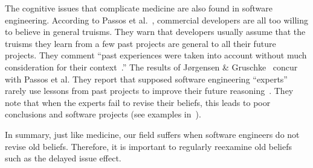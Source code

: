 \documentclass{sig-alternate}
\newcommand{\todo}[1]{\textcolor{Maroon}{TODO: #1}}
\begin{document}
The cognitive issues that complicate medicine are also found in software engineering.
According to Passos et al.~\cite{passos11}, commercial developers
are all too willing to believe in general
truisms.
They  warn that developers
usually assume that the truisms they learn from a few past
projects are general to 
all their future projects. They comment ``past experiences were taken into account without 
much consideration for their context~\cite{passos11}.''  
The results of J{\o}rgensen \& Gruschke~\cite{jorgensen09} concur with Passos et al. They report that 
  supposed software engineering    ``experts'' rarely use lessons
  from past projects to improve their future reasoning~\cite{jorgensen09}. 
 They note that
when the experts
  fail to revise their beliefs, this leads to poor
 conclusions and software projects  (see examples in~\cite{jorgensen09}).

In summary, just like medicine, our field suffers when
 software engineers do  not revise old beliefs.  Therefore, it is important
 to regularly  reexamine    old beliefs such as the delayed issue effect.
  
 
 
\end{document}

